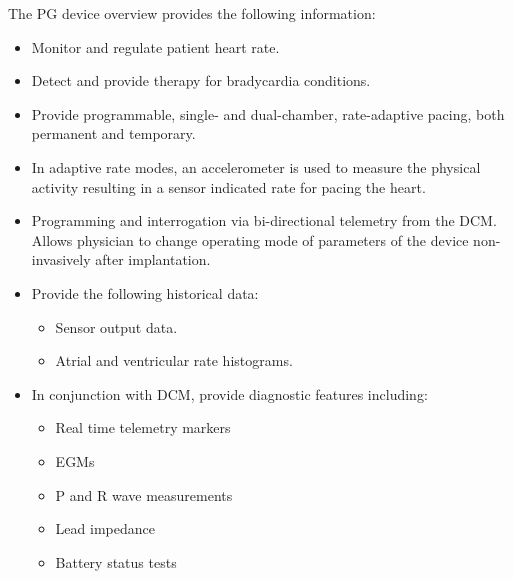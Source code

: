 The PG device overview provides the following information:
\begin{itemize}
	\item Monitor and regulate patient heart rate.
	\item Detect and provide therapy for bradycardia conditions.
	\item Provide programmable, single- and dual-chamber, rate-adaptive pacing, both permanent and temporary.
	\item In adaptive rate modes, an accelerometer is used to measure the physical activity resulting in a sensor indicated rate for pacing the heart.
	\item Programming and interrogation via bi-directional telemetry from the DCM. Allows physician to change operating mode of parameters of the device non-invasively after implantation.
	\item Provide the following historical data:
	\begin{itemize}
		\item Sensor output data.
		\item Atrial and ventricular rate histograms.
	\end{itemize}
	\item In conjunction with DCM, provide diagnostic features including:
	\begin{itemize}
		\item Real time telemetry markers
		\item EGMs
		\item P and R wave measurements
		\item Lead impedance
		\item Battery status tests
	\end{itemize}
\end{itemize}

